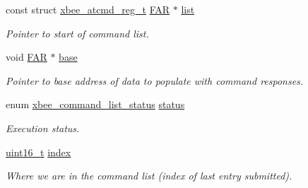 \begin{DoxyCompactItemize}
\item 
\mbox{\label{structxbee__command__list__context__t_a9bc069d8644766973622e77bb1091440}} 
const struct \hyperlink{structxbee__atcmd__reg__t}{xbee\+\_\+atcmd\+\_\+reg\+\_\+t} \hyperlink{group__hal_gaef060b3456fdcc093a7210a762d5f2ed}{F\+AR} $\ast$ \hyperlink{structxbee__command__list__context__t_a9bc069d8644766973622e77bb1091440}{list}
\begin{DoxyCompactList}\small\item\em Pointer to start of command list. \end{DoxyCompactList}\item 
\mbox{\label{structxbee__command__list__context__t_ae7bcc11b5181c49ed31113d5beb67c3c}} 
void \hyperlink{group__hal_gaef060b3456fdcc093a7210a762d5f2ed}{F\+AR} $\ast$ \hyperlink{structxbee__command__list__context__t_ae7bcc11b5181c49ed31113d5beb67c3c}{base}
\begin{DoxyCompactList}\small\item\em Pointer to base address of data to populate with command responses. \end{DoxyCompactList}\item 
\mbox{\label{structxbee__command__list__context__t_aa870726aac9643f0e8fa42ba9df544ca}} 
enum \hyperlink{group__xbee__atcmd_ga3ec63530d743d1c91126c67493c3245d}{xbee\+\_\+command\+\_\+list\+\_\+status} \hyperlink{structxbee__command__list__context__t_aa870726aac9643f0e8fa42ba9df544ca}{status}
\begin{DoxyCompactList}\small\item\em Execution status. \end{DoxyCompactList}\item 
\mbox{\label{structxbee__command__list__context__t_a852b86a2eaee9852ada7a43e61e311a2}} 
\hyperlink{group__hal__dos_ga5a8b2dc9e45a9ee81a94ef304fb62505}{uint16\+\_\+t} \hyperlink{structxbee__command__list__context__t_a852b86a2eaee9852ada7a43e61e311a2}{index}
\begin{DoxyCompactList}\small\item\em Where we are in the command list (index of last entry submitted). \end{DoxyCompactList}\end{DoxyCompactItemize}


